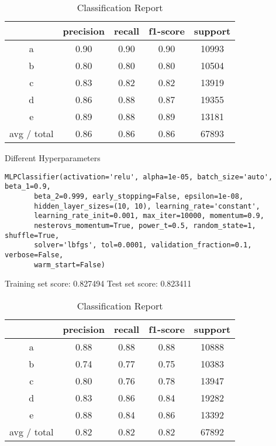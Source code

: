 \documentclass[journal]{IEEEtran}
\begin{document}
\begin{table}[ht]
\caption{Classification Report}
\label{Classification Report}
\centering
\begin{tabular}{|c||c|c|c|c|}
\hline
& precision & recall & f1-score & support \\
\hline
a & 0.90 & 0.90 & 0.90 & 10993 \\ 
\hline
b & 0.80 & 0.80 & 0.80 & 10504 \\
\hline
c & 0.83 & 0.82 & 0.82 & 13919 \\ 
\hline
d & 0.86 & 0.88 & 0.87 & 19355 \\ 
\hline
e & 0.89 & 0.88 & 0.89 & 13181 \\ 
\hline
avg / total & 0.86 & 0.86 & 0.86 & 67893 \\
\hline
\end{tabular}
\end{table}

Different Hyperparameters

\begin{lstlisting}
MLPClassifier(activation='relu', alpha=1e-05, batch_size='auto', beta_1=0.9,
       beta_2=0.999, early_stopping=False, epsilon=1e-08,
       hidden_layer_sizes=(10, 10), learning_rate='constant',
       learning_rate_init=0.001, max_iter=10000, momentum=0.9,
       nesterovs_momentum=True, power_t=0.5, random_state=1, shuffle=True,
       solver='lbfgs', tol=0.0001, validation_fraction=0.1, verbose=False,
       warm_start=False)
\end{lstlisting}

Training set score: 0.827494 Test set score: 0.823411

\begin{table}[ht]
\caption{Classification Report}
\label{Classification Report}
\centering
\begin{tabular}{|c||c|c|c|c|}
\hline
& precision & recall & f1-score & support \\
\hline
a & 0.88 & 0.88 & 0.88 & 10888 \\ 
\hline
b & 0.74 & 0.77 & 0.75 & 10383 \\
\hline
c & 0.80 & 0.76 & 0.78 & 13947 \\ 
\hline
d & 0.83 & 0.86 & 0.84 & 19282 \\ 
\hline
e & 0.88 & 0.84 & 0.86 & 13392 \\ 
\hline
avg / total & 0.82 & 0.82 & 0.82 & 67892 \\
\hline
\end{tabular}
\end{table}
\end{document}

